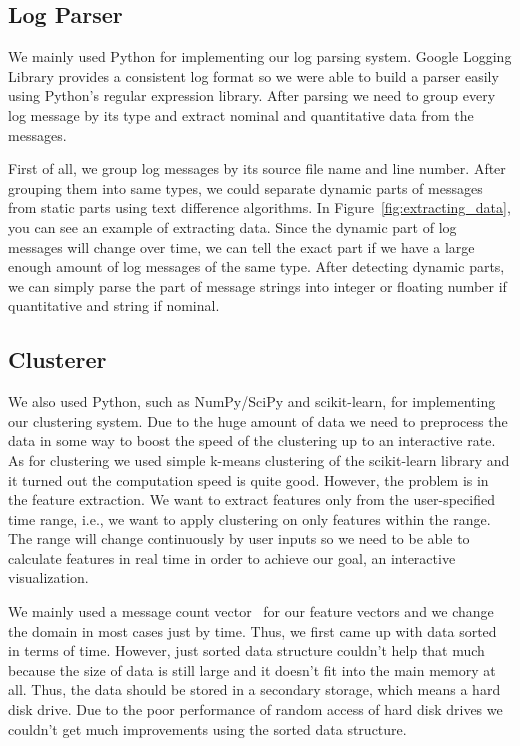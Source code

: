 \documentclass[conference]{acmsiggraph}
\begin{document}
\subsection{Log Parser}
We mainly used Python for implementing our log parsing system. Google Logging Library provides a
consistent log format so we were able to build a parser easily using Python's regular expression
library. After parsing we need to group every log message by its type and extract nominal and
quantitative data from the messages.

First of all, we group log messages by its source file name and line number. After grouping them
into same types, we could separate dynamic parts of messages from static parts using text difference
algorithms. In Figure~\ref{fig:extracting_data}, you can see an example of extracting data. Since
the dynamic part of log messages will change over time, we can tell the exact part if we have a
large enough amount of log messages of the same type. After detecting dynamic parts, we can simply
parse the part of message strings into integer or floating number if quantitative and string if
nominal.

\subsection{Clusterer}
We also used Python, such as NumPy/SciPy and scikit-learn, for implementing our clustering system.
Due to the huge amount of data we need to preprocess the data in some way to boost the speed of the
clustering up to an interactive rate. As for clustering we used simple k-means clustering
\cite{kmeans,Lloyd82} of the scikit-learn library \cite{scikit-learn} and it turned out the
computation speed is quite good. However, the problem is in the feature extraction. We want to
extract features only from the user-specified time range, i.e., we want to apply clustering on only
features within the range. The range will change continuously by user inputs so we need to be able
to calculate features in real time in order to achieve our goal, an interactive visualization.

We mainly used a message count vector~\cite{Xu09} for our feature vectors and we change the domain
in most cases just by time. Thus, we first came up with data sorted in terms of time. However, just
sorted data structure couldn't help that much because the size of data is still large and it doesn't
fit into the main memory at all. Thus, the data should be stored in a secondary storage, which means
a hard disk drive. Due to the poor performance of random access of hard disk drives we couldn't get
much improvements using the sorted data structure.
\end{document}
